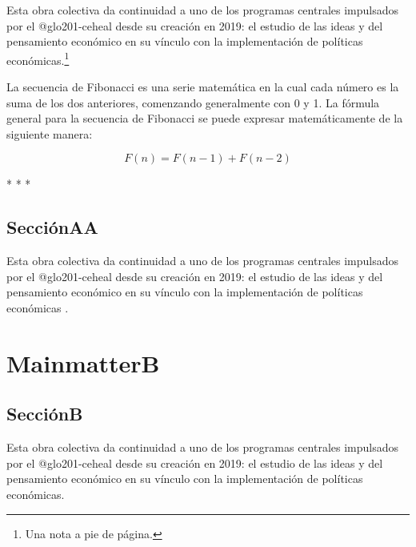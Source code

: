 Esta obra colectiva da continuidad a uno de los programas centrales impulsados por el \gls{@glo201-ceheal} desde su creación en 2019: el estudio de las ideas y del pensamiento económico en su vínculo con la implementación de políticas económicas.\footnote{Una nota a pie de página.}

La secuencia de Fibonacci es una serie matemática en la cual cada número es la suma de los dos anteriores, comenzando generalmente con 0 y 1. La fórmula general para la secuencia de Fibonacci se puede expresar matemáticamente de la siguiente manera:

$$F(n) = F(n-1) + F(n-2)$$

\ifPDF
\froufrou
\else
	\ifBNPDF
	\froufrou
	\else
		\ifODT
		\begin{center} * * * \end{center}
		\fi
	\fi
\fi

\section{SecciónAA}

Esta obra colectiva da continuidad a uno de los programas centrales impulsados por el \gls{@glo201-ceheal} desde su creación en 2019: el estudio de las ideas y del pensamiento económico en su vínculo con la implementación de políticas económicas \parencite{@940-SHUMWAY1999}.

\chapter{MainmatterB}

\section{SecciónB}

Esta obra colectiva da continuidad a uno de los programas centrales impulsados por el \gls{@glo201-ceheal} desde su creación en 2019: el estudio de las ideas y del pensamiento económico en su vínculo con la implementación de políticas económicas.

